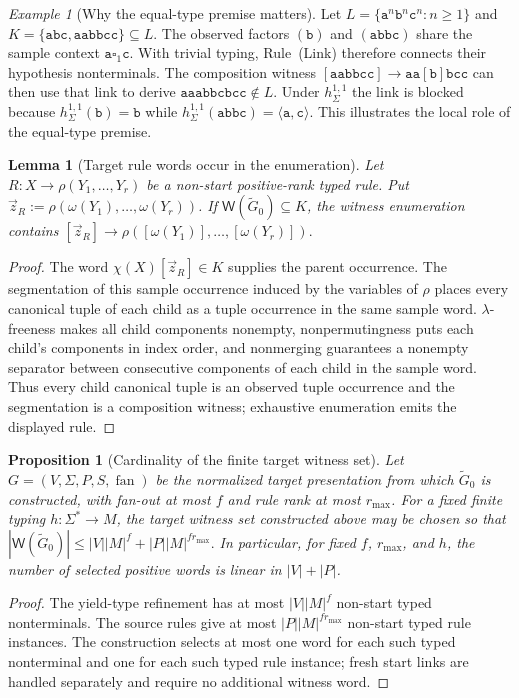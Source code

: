 \documentclass[11pt]{article}
\numberwithin{equation}{section}
\theoremstyle{plain}
\newtheorem{lemma}[theorem]{Lemma}
\newtheorem{proposition}[theorem]{Proposition}
\theoremstyle{definition}
\theoremstyle{remark}
\newtheorem{example}[theorem]{Example}
\newcommand{\Wit}{\mathsf{W}}
\newcommand{\tuple}[1]{\vec{#1}}
\newcommand{\blank}{\square}
\newcommand{\fan}{\operatorname{fan}}
\theoremstyle{plain}
\begin{document}
\begin{example}[Why the equal-type premise matters]
\label{ex:type-guard-purpose}
Let $L=\{\mathtt a^n\mathtt b^n\mathtt c^n:n\ge1\}$ and
$K=\{\mathtt{abc},\mathtt{aabbcc}\}\subseteq L$.  The observed factors
$(\mathtt b)$ and $(\mathtt{abbc})$ share the sample context
$\mathtt a\blank_1\mathtt c$.  With trivial typing, Rule~(Link) therefore
connects their hypothesis nonterminals.  The composition witness
$[\mathtt{aabbcc}]\to\mathtt{aa}[\mathtt b]\mathtt{bcc}$ can then use that
link to derive $\mathtt{aaabbcbcc}\notin L$.  Under $h_\Sigma^{1,1}$ the
link is blocked because $h_\Sigma^{1,1}(\mathtt b)=\mathtt b$ while
$h_\Sigma^{1,1}(\mathtt{abbc})=\langle\mathtt a,\mathtt c\rangle$.
This illustrates the local role of the equal-type premise.
\end{example}

\begin{lemma}[Target rule words occur in the enumeration]
\label{lem:exposed-rule-enumerated}
Let $R:X\to\rho(Y_1,\ldots,Y_r)$ be a non-start positive-rank typed rule.
Put $\tuple z_R:=\rho(\omega(Y_1),\ldots,\omega(Y_r))$.  If
$\Wit(\widetilde G_0)\subseteq K$, the witness enumeration contains
\([\tuple z_R]\to\rho([\omega(Y_1)],\ldots,[\omega(Y_r)]).\)
\end{lemma}
\begin{proof}
The word $\chi(X)[\tuple z_R]\in K$ supplies the parent occurrence.
The segmentation of this sample occurrence induced by the variables of
$\rho$ places every canonical tuple of each child as a tuple occurrence in the same sample word.  $\lambda$-freeness makes all child components nonempty, nonpermutingness
puts each child's components in index order, and nonmerging guarantees a
nonempty separator between consecutive components of each child in the
sample word.  Thus every child canonical tuple is an observed tuple occurrence and the
segmentation is a composition witness; exhaustive enumeration emits the
displayed rule.
\end{proof}

\begin{proposition}[Cardinality of the finite target witness set]
\label{prop:witness-cardinality}
Let $G=(V,\Sigma,P,S,\fan)$ be the normalized target presentation from which
$\widetilde G_0$ is constructed, with fan-out at most
$f$ and rule rank at most $r_{\max}$.  For a fixed finite typing
$h:\Sigma^*\to M$, the target witness set constructed
above may be chosen so that
\(|\Wit(\widetilde G_0)| \le |V||M|^f+|P||M|^{f r_{\max}}.\)
In particular, for fixed $f$, $r_{\max}$, and $h$, the number of selected positive
words is linear in $|V|+|P|$.
\end{proposition}
\begin{proof}
The yield-type refinement has at most $|V||M|^f$ non-start typed nonterminals.
The source rules give at most $|P||M|^{f r_{\max}}$ non-start typed rule
instances.  The construction selects at most one word for each such typed
nonterminal and one for each such typed rule instance; fresh start links are
handled separately and require no additional witness word.
\end{proof}
\end{document}
